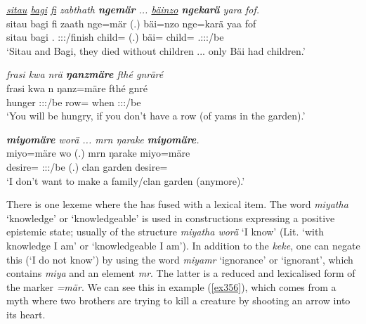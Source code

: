 \begin{exe}
	\ex \emph{\underline{sitau} \underline{bagi} \underline{fi} zabthath \textbf{ngemär} ... \underline{bäinzo} \textbf{ngekarä} yara fof.}\\
	\gll sitau bagi fi zaath nge=mär (.) bäi=nzo nge=karä yaa fof\\
	sitau bagi \Third.\Abs{} \Stpl:\Sbj:\Pst:\Pfv/finish child=\Priv{} (.) bäi=\Only{} child=\Prop{} \Tsg.\Masc:\Sbj:\Pst:\Ipfv/be \Emph\\ 
	\trans `Sitau and Bagi, they died without children ... only Bäi had children.'\\
	\label{ex353}
\end{exe}
\begin{exe}
	\ex \emph{frasi kwa nrä \textbf{ŋanzmäre} fthé gnräré}\\
	\gll frasi kwa n ŋanz=märe fthé gnré\\
	hunger \Fut{} \Ssg:\Sbj:\Nonpast:\Ipfv/be row=\Priv{} when \Ssg:\Sbj:\Imp:\Ipfv/be\\
	\trans `You will be hungry, if you don't have a row (of yams in the garden).'\\
	\label{ex354}
\end{exe}
\begin{exe}
	\ex \emph{\textbf{miyomäre} worä ... mrn ŋarake \textbf{miyomäre}.}\\
	\gll miyo=märe wo (.) mrn ŋarake miyo=märe\\
	desire=\Priv{} \Fsg:\Sbj:\Nonpast:\Ipfv/be (.) clan garden desire=\Priv{}\\
	\trans `I don't want to make a family/clan garden (anymore).'\\
	\label{ex355}
\end{exe}

There is one lexeme where the   has fused with a lexical item. The word \emph{miyatha} `knowledge' or `knowledgeable' is used in constructions expressing a positive epistemic state; usually of the structure \emph{miyatha worä} `I know' (Lit. `with knowledge I am' or `knowledgeable I am'). In addition to the  \emph{keke}, one can negate this (`I do not know') by using the word \emph{miyamr} `ignorance' or `ignorant', which contains \emph{miya} and an element \emph{mr}. The latter is a reduced and lexicalised form of the   marker \emph{=mär}. We can see this in example (\ref{ex356}), which comes from a myth where two brothers are trying to kill a creature by shooting an arrow into its heart.
	 
